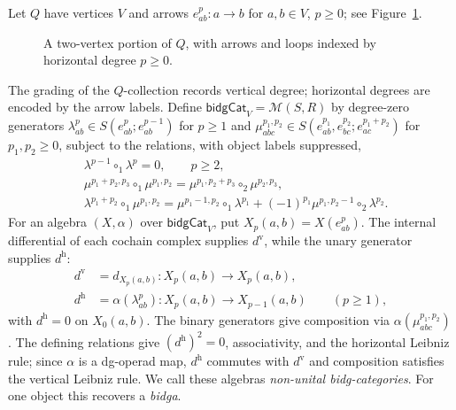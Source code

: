 \documentclass[11pt,letterpaper]{article}
\numberwithin{equation}{section}
\theoremstyle{plain}
\theoremstyle{definition}
\theoremstyle{remark}
\begin{document}
Let $Q$ have vertices $V$ and arrows $e^p_{ab}:a\to b$ for
$a,b\in V$, $p\geq0$; see Figure~\ref{fig:derived-category-quiver}.
\begin{figure}[htbp]
\centering

\caption{A two-vertex portion of $Q$, with arrows and loops indexed by
horizontal degree $p\geq0$.}
\label{fig:derived-category-quiver}
\end{figure}

The grading of the $Q$-collection records vertical degree; horizontal
degrees are encoded by the arrow labels.
Define $\mathsf{bidgCat}_V=\mathscr M(S,R)$ by degree-zero generators
$\lambda^p_{ab}\in S(e^p_{ab};e^{p-1}_{ab})$ for $p\geq1$ and
$\mu^{p_1,p_2}_{abc}\in
S(e^{p_1}_{ab},e^{p_2}_{bc};e^{p_1+p_2}_{ac})$ for $p_1,p_2\geq0$,
subject to the relations, with object labels suppressed,
\[
\begin{aligned}
 &\lambda^{p-1}\circ_1\lambda^p=0,\qquad p\geq2,\\
 &\mu^{p_1+p_2,p_3}\circ_1\mu^{p_1,p_2}
   =\mu^{p_1,p_2+p_3}\circ_2\mu^{p_2,p_3},\\
 &\lambda^{p_1+p_2}\circ_1\mu^{p_1,p_2}
   =\mu^{p_1-1,p_2}\circ_1\lambda^{p_1}
    +(-1)^{p_1}\mu^{p_1,p_2-1}\circ_2\lambda^{p_2}.
\end{aligned}
\]
For an algebra $(X,\alpha)$ over $\mathsf{bidgCat}_V$, put
$X_p(a,b)=X(e^p_{ab})$. The internal differential of each cochain
complex supplies $d^{\mathrm v}$, while the unary generator supplies
$d^{\mathrm h}$:
\[
\begin{aligned}
 d^{\mathrm v}&=d_{X_p(a,b)}:
 X_p(a,b)\longrightarrow X_p(a,b),\\
 d^{\mathrm h}&=\alpha(\lambda^p_{ab}):
 X_p(a,b)\longrightarrow X_{p-1}(a,b)\qquad(p\geq1),
\end{aligned}
\]
with $d^{\mathrm h}=0$ on $X_0(a,b)$. The binary generators give
composition via $\alpha(\mu^{p_1,p_2}_{abc})$. The defining relations
give $(d^{\mathrm h})^2=0$, associativity, and the horizontal Leibniz
rule; since $\alpha$ is a dg-operad map, $d^{\mathrm h}$ commutes with
$d^{\mathrm v}$ and composition satisfies the vertical Leibniz rule.
We call these algebras \textit{non-unital bidg-categories}. For one
object this recovers a \textit{bidga}.
\end{document}
